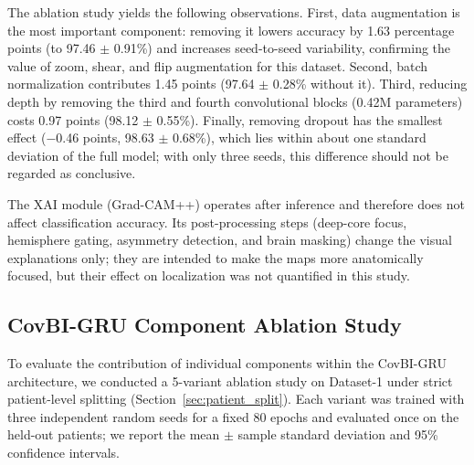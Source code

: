 \documentclass[a4paper,fleqn]{cas-sc}
\begin{document}
The ablation study yields the following observations. First, data augmentation is the most important component: removing it lowers accuracy by 1.63 percentage points (to 97.46 $\pm$ 0.91\%) and increases seed-to-seed variability, confirming the value of zoom, shear, and flip augmentation for this dataset. Second, batch normalization contributes 1.45 points (97.64 $\pm$ 0.28\% without it). Third, reducing depth by removing the third and fourth convolutional blocks (0.42M parameters) costs 0.97 points (98.12 $\pm$ 0.55\%). Finally, removing dropout has the smallest effect ($-$0.46 points, 98.63 $\pm$ 0.68\%), which lies within about one standard deviation of the full model; with only three seeds, this difference should not be regarded as conclusive.

The XAI module (Grad-CAM++) operates after inference and therefore does not affect classification accuracy. Its post-processing steps (deep-core focus, hemisphere gating, asymmetry detection, and brain masking) change the visual explanations only; they are intended to make the maps more anatomically focused, but their effect on localization was not quantified in this study.

\subsection{CovBI-GRU Component Ablation Study}
\label{sec:covbigru_ablation}

To evaluate the contribution of individual components within the CovBI-GRU architecture, we conducted a 5-variant ablation study on Dataset-1 under strict patient-level splitting (Section~\ref{sec:patient_split}). Each variant was trained with three independent random seeds for a fixed 80 epochs and evaluated once on the held-out patients; we report the mean $\pm$ sample standard deviation and 95\% confidence intervals.

\begin{table}[!htbp]
\centering
\caption{CovBI-GRU Ablation Study --- 3-Seed Repeated Trials (Patient-Level Split, 80 Epochs)}
\label{tab:covbigru_ablation}
\small
{}
\end{table}
\end{document}
